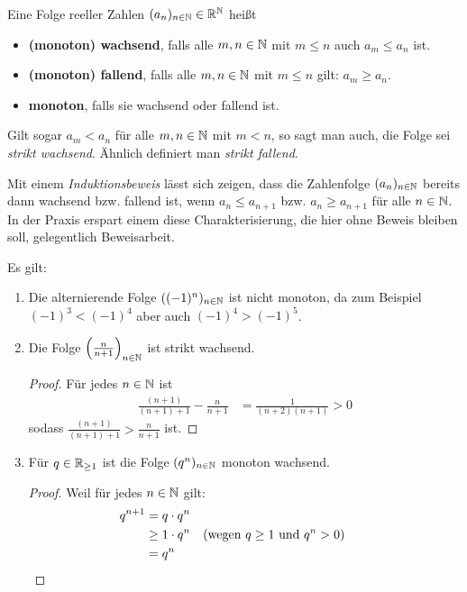 \begin{defin}[Monotonie]   
    Eine Folge reeller Zahlen $(a_n)_{n\in \mathbb N}\in \mathbb R^\mathbb N$ heißt
    \begin{itemize}
        \item \textbf{(monoton) wachsend}, falls alle $m,n\in \mathbb N$ mit $m\le n$ auch $a_m\le a_n$ ist.
        \item \textbf{(monoton) fallend}, falls alle $m,n\in \mathbb N$ mit $m\le n$ gilt: $a_m\ge a_n$.
        \item \textbf{monoton}, falls sie wachsend oder fallend ist.
    \end{itemize}
    Gilt sogar $a_m<a_n$ für alle $m,n\in \mathbb N$ mit $m<n$, so sagt man auch, die Folge sei \emph{strikt wachsend}. Ähnlich definiert man \emph{strikt fallend}.

    Mit einem \emph{Induktionsbeweis} lässt sich zeigen, dass die Zahlenfolge $(a_n)_{n\in \mathbb N}$ bereits dann wachsend bzw. fallend ist, wenn $a_n\le a_{n+1}$ bzw. $a_n\ge a_{n+1}$ für alle $n\in \mathbb N$. In der Praxis erspart einem diese Charakterisierung, die hier ohne Beweis bleiben soll, gelegentlich Beweisarbeit.
\end{defin}


\begin{bsp}
Es gilt:
    \begin{enumerate}
        \item Die alternierende Folge $((-1)^n)_{n\in \mathbb N}$ ist nicht monoton, da zum Beispiel $(-1)^3< (-1)^4$ aber auch $(-1)^4>(-1)^5$.
        \item Die Folge $\left(\frac{n}{n+1}\right)_{n\in \mathbb N}$ ist strikt wachsend.
        \begin{proof}
            Für jedes $n\in \mathbb N$ ist
            \begin{align*}
                \frac{(n+1)}{(n+1)+1} - \frac{n}{n+1} & = \frac{1}{(n+2)(n+1)} >0
            \end{align*}
            sodass $\frac{(n+1)}{(n+1)+1} > \frac{n}{n+1}$ ist.
        \end{proof}
        \item Für $q\in \mathbb R_{\ge 1}$ ist die Folge $(q^n)_{n\in \mathbb N}$ monoton wachsend.
        \begin{proof}
            Weil für jedes $n\in \mathbb N$ gilt:
            \begin{align*}
                q^{n+1} & = q \cdot q^n \\
                & \ge 1 \cdot q^n && (\text{wegen $q\ge 1$ und $q^n>0$})\\
                & = q^n &&&& \qedhere
            \end{align*}
        \end{proof}
    \end{enumerate}
\end{bsp}


